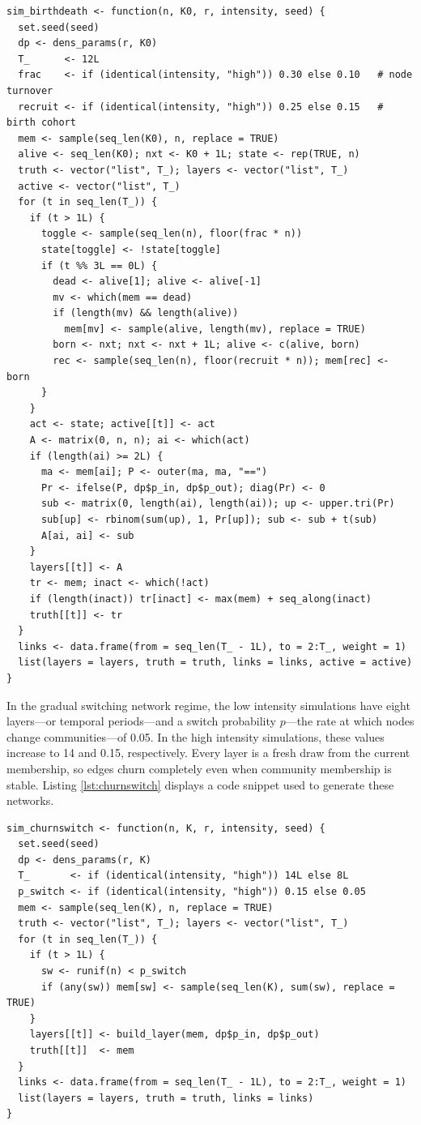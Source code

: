 \documentclass[11pt, letterpaper]{article}
\numberwithin{equation}{section}
\begin{document}
\begin{lstlisting}[caption={Births and deaths generator.},
                   label={lst:birthdeath}]
sim_birthdeath <- function(n, K0, r, intensity, seed) {
  set.seed(seed)
  dp <- dens_params(r, K0)
  T_      <- 12L
  frac    <- if (identical(intensity, "high")) 0.30 else 0.10   # node turnover
  recruit <- if (identical(intensity, "high")) 0.25 else 0.15   # birth cohort
  mem <- sample(seq_len(K0), n, replace = TRUE)
  alive <- seq_len(K0); nxt <- K0 + 1L; state <- rep(TRUE, n)
  truth <- vector("list", T_); layers <- vector("list", T_)
  active <- vector("list", T_)
  for (t in seq_len(T_)) {
    if (t > 1L) {
      toggle <- sample(seq_len(n), floor(frac * n))
      state[toggle] <- !state[toggle]
      if (t %% 3L == 0L) {
        dead <- alive[1]; alive <- alive[-1]
        mv <- which(mem == dead)
        if (length(mv) && length(alive))
          mem[mv] <- sample(alive, length(mv), replace = TRUE)
        born <- nxt; nxt <- nxt + 1L; alive <- c(alive, born)
        rec <- sample(seq_len(n), floor(recruit * n)); mem[rec] <- born
      }
    }
    act <- state; active[[t]] <- act
    A <- matrix(0, n, n); ai <- which(act)
    if (length(ai) >= 2L) {
      ma <- mem[ai]; P <- outer(ma, ma, "==")
      Pr <- ifelse(P, dp$p_in, dp$p_out); diag(Pr) <- 0
      sub <- matrix(0, length(ai), length(ai)); up <- upper.tri(Pr)
      sub[up] <- rbinom(sum(up), 1, Pr[up]); sub <- sub + t(sub)
      A[ai, ai] <- sub
    }
    layers[[t]] <- A
    tr <- mem; inact <- which(!act)
    if (length(inact)) tr[inact] <- max(mem) + seq_along(inact)
    truth[[t]] <- tr
  }
  links <- data.frame(from = seq_len(T_ - 1L), to = 2:T_, weight = 1)
  list(layers = layers, truth = truth, links = links, active = active)
}
\end{lstlisting}


In  the gradual switching network regime, the low intensity simulations have eight layers---or temporal periods---and a switch probability $p$---the rate at which nodes change communities---of 0.05. In the high intensity simulations, these values increase to 14 and 0.15, respectively. Every layer is a fresh draw from the current membership, so edges churn completely even when community membership is stable. Listing \ref{lst:churnswitch} displays a code snippet used to generate these networks.

\begin{lstlisting}[caption={Gradual switching generator.},
                   label={lst:churnswitch}]
sim_churnswitch <- function(n, K, r, intensity, seed) {
  set.seed(seed)
  dp <- dens_params(r, K)
  T_       <- if (identical(intensity, "high")) 14L else 8L
  p_switch <- if (identical(intensity, "high")) 0.15 else 0.05
  mem <- sample(seq_len(K), n, replace = TRUE)
  truth <- vector("list", T_); layers <- vector("list", T_)
  for (t in seq_len(T_)) {
    if (t > 1L) {
      sw <- runif(n) < p_switch
      if (any(sw)) mem[sw] <- sample(seq_len(K), sum(sw), replace = TRUE)
    }
    layers[[t]] <- build_layer(mem, dp$p_in, dp$p_out)
    truth[[t]]  <- mem
  }
  links <- data.frame(from = seq_len(T_ - 1L), to = 2:T_, weight = 1)
  list(layers = layers, truth = truth, links = links)
}
\end{lstlisting}
\end{document}
